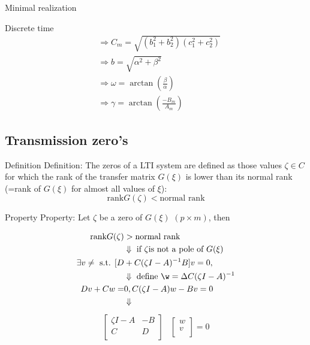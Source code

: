 \begin{subsection}{Minimal realization}
\begin{frame}{Discrete time}
\begin{align*}
&\Rightarrow C_m=\sqrt{(b_1^2+b_2^2)(c_1^2+c_2^2)}\\
&\Rightarrow b=\sqrt{\alpha^2+\beta^2}\\
&\Rightarrow \omega=\arctan{(\frac{\beta}{\alpha})}\\
&\Rightarrow \gamma =\arctan{(\frac{-B_m}{A_m})}
\end{align*}
\end{frame}

\subsection{Transmission zero's}
\begin{frame}{Definition}
Definition: The zeros of a LTI system are defined as those
values $\zeta\in C$ for which the rank of the transfer matrix $G(\xi)$
is lower than its normal rank (=rank of $G(\xi)$ for almost all
values of $\xi$):
$$\text{rank}G(\zeta)<\text{normal rank}$$
\end{frame}



\begin{frame}{Property}
Property: Let $\zeta$ be a zero of $G(\xi)$ $(p\times m)$, then


\begin{align*}
\text{rank}G(\zeta)&>\text{normal rank}\\
&\Downarrow\text{ if }\zeta\text{is not a pole of } G(\xi)\\
\exists v\neq \text{ s.t. }[D &+ C(\zeta I - A)^{-1}B]v=0,\\
&\Downarrow \text{ define }\w={\Delta}C(\zeta I - A)^{-1}\\
Dv+Cw=&0,C(\zeta I - A)w-Bv=0\\
&\Downarrow\\
\end{align*}
\vspace{-1.2cm}
\begin{align*}
\begin{bmatrix}
    \zeta I-A&-B\\
    C&D\\
\end{bmatrix}&
\begin{bmatrix}
    w\\
    v\\
\end{bmatrix}=0
\end{align*}
\end{frame}


\end{subsection}
